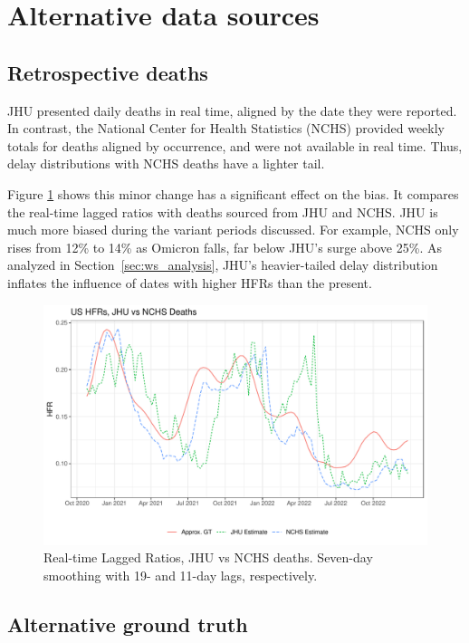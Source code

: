\documentclass{article}
\begin{document}
\section{Alternative data sources}
\subsection{Retrospective deaths}\label{apx:NCHS_deaths}

JHU presented daily deaths in real time, aligned by the date they were reported. In contrast, the National Center for Health Statistics (NCHS) provided weekly totals for deaths aligned by occurrence, and were not available in real time. Thus, delay distributions with NCHS deaths have a lighter tail. 

Figure \ref{fig:jhu_vs_nchs} shows this minor change has a significant effect on the bias. It compares the real-time lagged ratios with deaths sourced from JHU and NCHS. JHU is much more biased during the variant periods discussed. For example, NCHS only rises from 12\% to 14\% as Omicron falls, far below JHU's surge above 25\%. As analyzed in Section~\ref{sec:ws_analysis}, JHU's heavier-tailed delay distribution inflates the influence of dates with higher HFRs than the present.


\begin{figure}
    \centering
    \includegraphics[width=0.7\linewidth]{Figs/Real/jhu_vs_nchs.pdf}
    \caption{Real-time Lagged Ratios, JHU vs NCHS deaths. Seven-day smoothing with 19- and 11-day lags, respectively.}
    \label{fig:jhu_vs_nchs}
\end{figure}


\subsection{Alternative ground truth}\label{apx:alt_gt}
\end{document}
